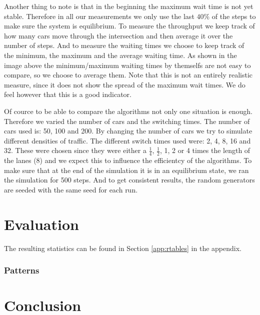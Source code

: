 \documentclass[a4paper,11pt]{article}
\begin{document}
Another thing to note is that in the beginning the maximum wait time is not yet stable.
Therefore in all our measurements we only use the last $40\%$ of the steps to make sure the system is equilibrium.
To measure the throughput we keep track of how many cars move through the intersection and then average it over the number of steps.
And to measure the waiting times we choose to keep track of the minimum, the maximum and the average waiting time.
As shown in the image above the minimum/maximum waiting times by themselfs are not easy to compare, so we choose to average them.
Note that this is not an entirely realistic measure, since it does not show the spread of the maximum wait times.
We do feel however that this is a good indicator.


Of cource to be able to compare the algorithms not only one situation is enough.
Therefore we varied the number of cars and the switching times.
The number of cars used is: 50, 100 and 200.
By changing the number of cars we try to simulate different densities of traffic.
The different switch times used were: 2, 4, 8, 16 and 32.
These were chosen since they were either a $\frac{1}{4}$, $\frac{1}{2}$, 1, 2 or 4 times the length of the lanes (8) and we expect this to influence the efficientcy of the algorithms.
To make sure that at the end of the simulation it is in an equilibrium state, we ran the simulation for 500 steps.
And to get consistent results, the random generators are seeded with the same seed for each run.

\section{Evaluation}\label{sec:eval}

The resulting statistics can be found in Section \ref{app:rtables} in the appendix.

\subsubsection*{Patterns}


\section{Conclusion}\label{sec:conclusion}

\end{document}

